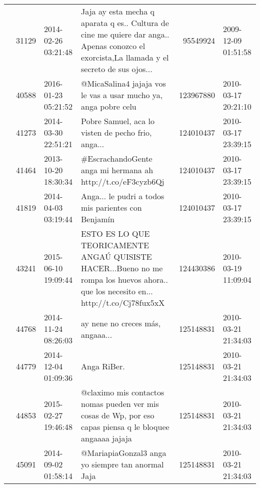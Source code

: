 \begin{tabular}{llllrl}
           & 31129   & 2014-02-26 03:21:48 &  Jaja ay esta mecha q aparata q es.. Cultura de cine me quiere dar anga.. Apenas conozco el exorcista,La llamada y el secreto de sus ojos... &    95549924 & 2009-12-09 01:51:58 \\
           & 40588   & 2016-01-23 05:21:52 &                                                                              @MicaSalina4 jajaja vos le vas a usar mucho ya, anga pobre celu &   123967880 & 2010-03-17 20:21:10 \\
           & 41273   & 2014-03-30 22:51:21 &                                                                                           Pobre Samuel, aca lo visten de pecho frio, anga... &   124010437 & 2010-03-17 23:39:15 \\
           & 41464   & 2013-10-20 18:30:34 &                                                                                  \#EscrachandoGente anga mi hermana ah http://t.co/eF3cyzb6Qj &   124010437 & 2010-03-17 23:39:15 \\
           & 41819   & 2014-04-03 03:19:44 &                                                                                          Anga... le pudri a todos mis parientes con Benjamín &   124010437 & 2010-03-17 23:39:15 \\
           & 43241   & 2015-06-10 19:09:44 &        ESTO ES LO QUE TEORICAMENTE ANGAÚ QUISISTE HACER...Bueno no me rompa los huevos ahora.. que los necesito en... http://t.co/Cj78fux5xX &   124430386 & 2010-03-19 11:09:04 \\
           & 44768   & 2014-11-24 08:26:03 &                                                                                                             ay nene no creces más, angaaa... &   125148831 & 2010-03-21 21:34:03 \\
           & 44779   & 2014-12-04 01:09:36 &                                                                                                                                  Anga RiBer. &   125148831 & 2010-03-21 21:34:03 \\
           & 44853   & 2015-02-27 19:46:48 &                                    @claximo mis contactos nomas pueden ver mis cosas de Wp, por eso capas piensa q le bloquee angaaaa jajaja &   125148831 & 2010-03-21 21:34:03 \\
           & 45091   & 2014-09-02 01:58:14 &                                                                                            @MariapiaGonzal3 anga yo siempre tan anormal Jaja &   125148831 & 2010-03-21 21:34:03 \\

\end{tabular}
